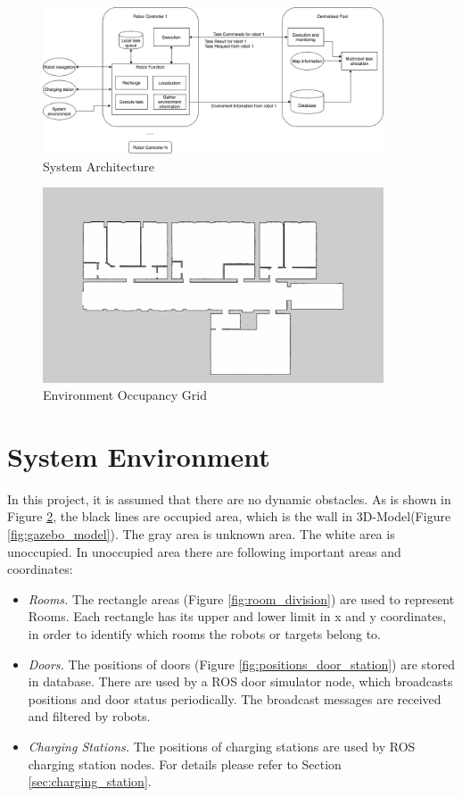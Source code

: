 \begin{figure}[htbp]
	\centering
	\includegraphics[width = 0.9\textwidth]{content/images/ch3/architecture.drawio.png}
	\caption{System Architecture}
	\label{fig:system_architecture}
\end{figure}

\begin{figure}[htbp]
	\centering
	\includegraphics[width = 0.9\textwidth]{content/images/ch3/occupancy_grid.png}
	\caption{Environment Occupancy Grid}
	\label{fig:occupancy_grid}
\end{figure}

\section{System Environment}
In this project, it is assumed that there are no dynamic obstacles. As is shown in Figure \ref{fig:occupancy_grid}, the black lines are occupied area, which is the wall in 3D-Model(Figure \ref{fig:gazebo_model}). The gray area is unknown area. 
The white area is unoccupied. In unoccupied area there are following important areas and coordinates:
\begin{itemize}
	\item \textsl{Rooms.} The rectangle areas (Figure \ref{fig:room_division}) are used to represent Rooms. Each rectangle has its upper and lower limit in x and y coordinates, in order to identify which rooms the robots or targets belong to. 
	\item \textsl{Doors.} The positions of doors (Figure \ref{fig:positions_door_station}) are stored in database. There are used by a ROS door simulator node, which broadcasts positions and door status periodically. The broadcast messages are received and filtered by robots.
	\item \textsl{Charging Stations.} The positions of charging stations are used by ROS charging station nodes. For details please refer to Section \ref{sec:charging_station}.
\end{itemize}

